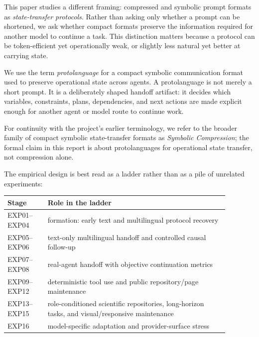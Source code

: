\documentclass[11pt]{article}
\begin{document}
This paper studies a different framing: compressed and symbolic prompt formats as \emph{state-transfer protocols}. Rather than asking only whether a prompt can be shortened, we ask whether compact formats preserve the information required for another model to continue a task. This distinction matters because a protocol can be token-efficient yet operationally weak, or slightly less natural yet better at carrying state.

We use the term \emph{protolanguage} for a compact symbolic communication format used to preserve operational state across agents. A protolanguage is not merely a short prompt. It is a deliberately shaped handoff artifact: it decides which variables, constraints, plans, dependencies, and next actions are made explicit enough for another agent or model route to continue work.

For continuity with the project's earlier terminology, we refer to the broader family of compact symbolic state-transfer formats as \emph{Symbolic Compression}; the formal claim in this report is about protolanguages for operational state transfer, not compression alone.

The empirical design is best read as a ladder rather than as a pile of unrelated experiments:

\begin{center}
\small
\begin{tabular}{p{0.16\linewidth}p{0.72\linewidth}}
\toprule
Stage & Role in the ladder \\
\midrule
EXP01--EXP04 & formation: early text and multilingual protocol recovery \\
EXP05--EXP06 & text-only multilingual handoff and controlled causal follow-up \\
EXP07--EXP08 & real-agent handoff with objective continuation metrics \\
EXP09--EXP12 & deterministic tool use and public repository/page maintenance \\
EXP13--EXP15 & role-conditioned scientific repositories, long-horizon tasks, and visual/responsive maintenance \\
EXP16 & model-specific adaptation and provider-surface stress \\
\bottomrule
\end{tabular}
\end{center}
\end{document}

